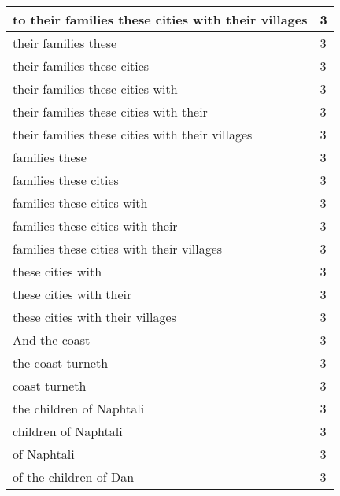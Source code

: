 \begin{center}
\begin{longtable}{|p{3.0in}|p{0.5in}|}
to their families these cities with their villages & 3\\ \hline 
their families these & 3\\ \hline 
their families these cities & 3\\ \hline 
their families these cities with & 3\\ \hline 
their families these cities with their & 3\\ \hline 
their families these cities with their villages & 3\\ \hline 
families these & 3\\ \hline 
families these cities & 3\\ \hline 
families these cities with & 3\\ \hline 
families these cities with their & 3\\ \hline 
families these cities with their villages & 3\\ \hline 
these cities with & 3\\ \hline 
these cities with their & 3\\ \hline 
these cities with their villages & 3\\ \hline 
And the coast & 3\\ \hline 
the coast turneth & 3\\ \hline 
coast turneth & 3\\ \hline 
the children of Naphtali & 3\\ \hline 
children of Naphtali & 3\\ \hline 
of Naphtali & 3\\ \hline 
of the children of Dan & 3\\ \hline 
\end{longtable}
\end{center}






